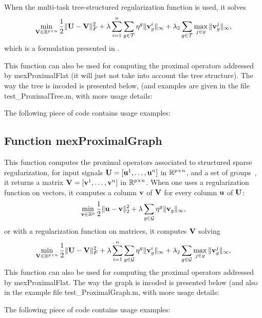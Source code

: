 \documentclass[a4paper, 11pt]{article}
\begin{document}
   When the multi-task tree-structured regularization function is used, it solves
   \begin{equation}
   \min_{{\mathbf V} \in {\mathbb R}^{p\times n}} \frac{1}{2}\|{\mathbf U}-{\mathbf V}\|_F^2 + \lambda \sum_{i=1}^n\sum_{g \in {\mathcal T}} \eta^g \|{\mathbf v}^i_g\|_\infty + \lambda_2\sum_{g \in {\mathcal T}} \max_{j \in g} \|{\mathbf v}^j_g\|_\infty,
   \end{equation} 
   which is a formulation presented in \cite{mairal10}.

   This function can also be used for computing the proximal operators addressed by mexProximalFlat (it will just not take into account the tree structure). The way the tree is incoded is presented below, (and examples are given in the file test\_ProximalTree.m, with more usage details:

The following piece of code contains usage examples:


%          

\subsection{Function mexProximalGraph}
This function computes the proximal operators associated to structured sparse regularization, for input signals ${\mathbf U}=[{\mathbf u}^1,\ldots,{\mathbf u}^n]$ in ${\mathbb R}^{p \times n}$, and a set of groups~\cite{mairal10}, it returns a matrix ${\mathbf V}=[{\mathbf v}^1,\ldots,{\mathbf v}^n]$ in ${\mathbb R}^{p \times n}$.
When one uses a regularization function on vectors, it computes a column ${\mathbf v}$ of ${\mathbf V}$ for every column ${\mathbf u}$ of ${\mathbf U}$:
\begin{equation}
\min_{{\mathbf v} \in {\mathbb R}^p} \frac{1}{2}\|{\mathbf u}-{\mathbf v}\|_2^2 + \lambda \sum_{g \in {\mathcal G}} \eta^g \|{\mathbf v}_g\|_\infty,
\end{equation}
or with a regularization function on matrices, it computes ${\mathbf V}$ solving
\begin{equation}
\min_{{\mathbf V} \in {\mathbb R}^{p\times n}} \frac{1}{2}\|{\mathbf U}-{\mathbf V}\|_F^2 + \lambda \sum_{i=1}^n\sum_{g \in {\mathcal G}} \eta^g \|{\mathbf v}^i_g\|_\infty + \lambda_2\sum_{g \in {\mathcal G}} \max_{j \in g} \|{\mathbf v}^j_g\|_\infty,
\end{equation} 
This function can also be used for computing the proximal operators addressed by mexProximalFlat. The way the graph is incoded is presented below (and also in the example file test\_ProximalGraph.m, with more usage details:

The following piece of code contains usage examples:

\end{document}

